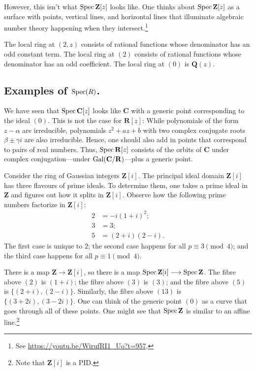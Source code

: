 \documentclass [11 pt, oneside] {article}
\begin{document}
However, this isn't what $\operatorname{Spec} \mathbf{Z}[z]$ looks like. One thinks about $\operatorname{Spec} \mathbf{Z}[z]$ as a surface with points, vertical lines, and horizontal lines that illuminate algebraic number theory happening when they intersect.\footnote{See \url{https://youtu.be/WirufRI1_Uo?t=957}.} 

The local ring at $(2,z)$ consists of rational functions whose denominator has an odd constant term. The local ring at $(2)$ consists of rational functions whose denominator has an odd coefficient. The local ring at $(0)$ is $\mathbf{Q}(z)$.

\subsection{Examples of \texorpdfstring{$\operatorname{Spec}(R)$}{Spec (R)}.}
\begin{example}[ ]\label{}\text{}
We have seen that $\operatorname{Spec} \mathbf{C}[z]$ looks like $\mathbf{C}$ with a generic point corresponding to the ideal $(0)$. This is not the case for $\mathbf{R}[z]$: While polynomials of the form $z-\alpha$ are irreducible, polynomials $z^2 + az + b$ with two complex conjugate roots $\beta\pm \gamma i$ are also irreducible. Hence, one should also add in points that correspond to pairs of real numbers. Thus, $\operatorname{Spec} \mathbf{R}[z]$ consists of the orbits of $\mathbf{C}$ under complex conjugation---under $\operatorname{Gal}(\mathbf{C}/\mathbf{R})$---plus a generic point.
\end{example}

\begin{example}[ ]\label{}\text{}
Consider the ring of Gaussian integers $\mathbf{Z}[i]$. The principal ideal domain $\mathbf{Z}[i]$ has three flavours of prime ideals. To determine them, one takes a prime ideal in $\mathbf{Z}$ and figures out how it splits in $\mathbf{Z}[i]$. Observe how the following prime numbers factorize in $\mathbf{Z}[i]$:
\begin{align*}
	2 &= -i (1+i)^2;\\ 
	3 &= 3;\\
	5 &= (2+i) (2-i).
\end{align*}
The first case is unique to $2$; the second case happens for all $p\equiv 3\pmod 4$; and the third case happens for all $p\equiv 1\pmod 4$.

There is a map $\mathbf{Z}\longrightarrow \mathbf{Z}[i]$, so there is a map $\operatorname{Spec} \mathbf{Z}[i]\longrightarrow \operatorname{Spec} \mathbf{Z}$. The fibre above $(2)$ is $(1+i)$; the fibre above $(3)$ is $(3)$; and the fibre above $(5)$ is $\{(2+i),  (2-i)\}$. Similarly, the fibre above $(13)$ is $\{(3+2i),  (3-2i)\}$. One can think of the generic point $(0)$ as a curve that goes through all of these points. One might see that $\operatorname{Spec} \mathbf{Z}$ is similar to an affine line.\footnote{Note that $\mathbf{Z}[i]$ is a PID.}
\end{example}
\end{document}
